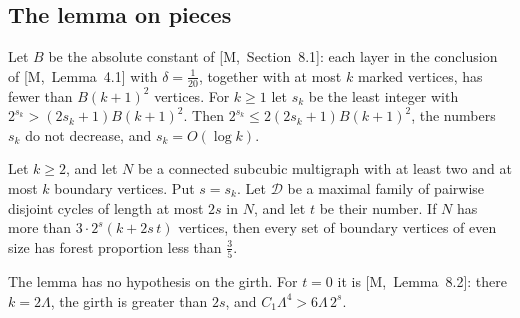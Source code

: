 \documentclass[11pt]{article}
\newcommand{\M}[1]{[M,~#1]}
\begin{document}
\subsection{The lemma on pieces}

Let $B$ be the absolute constant of \M{Section~8.1}: each layer in the conclusion of
\M{Lemma~4.1} with $\delta=\frac1{20}$, together with at most $k$ marked vertices, has fewer than
$B(k+1)^{2}$ vertices. For $k\ge1$ let $s_k$ be the least integer with
$2^{s_k}>(2s_k+1)B(k+1)^{2}$. Then $2^{s_k}\le2(2s_k+1)B(k+1)^{2}$, the numbers $s_k$ do not
decrease, and $s_k=O(\log k)$.

\begin{lemma}\label{lem:few}
Let $k\ge2$, and let $N$ be a connected subcubic multigraph with at least two and at most $k$
boundary vertices. Put $s=s_k$. Let $\mathcal D$ be a maximal family of pairwise disjoint cycles
of length at most $2s$ in $N$, and let $t$ be their number. If $N$ has more than
$3\cdot2^{s}(k+2s\,t)$ vertices, then every set of boundary vertices of even size
has forest proportion less than $\frac35$.
\end{lemma}

The lemma has no hypothesis on the girth. For $t=0$ it is \M{Lemma~8.2}: there
$k=2\Lambda$, the girth is greater than $2s$, and $C_1\Lambda^{4}>6\Lambda\,2^{s}$.
\end{document}
